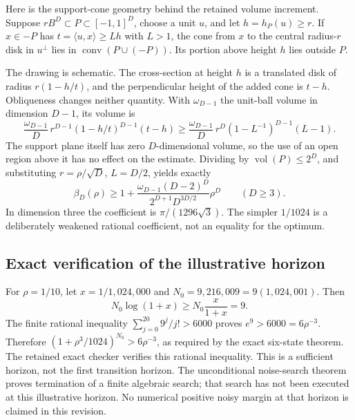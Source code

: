 \documentclass[11pt]{amsart}
\numberwithin{equation}{section}
\DeclareMathOperator{\conv}{conv}
\DeclareMathOperator{\vol}{vol}
\begin{document}
Here is the support-cone geometry behind the retained volume increment. Suppose $rB^D\subset P\subset[-1,1]^D$, choose a unit $u$, and let $h=h_P(u)\ge r$. If $x\in-P$ has $t=\langle u,x\rangle\ge Lh$ with $L>1$, the cone from $x$ to the central radius-$r$ disk in $u^\perp$ lies in $\conv(P\cup(-P))$. Its portion above height $h$ lies outside $P$.
\begin{center}
\end{center}
The drawing is schematic. The cross-section at height $h$ is a translated disk of radius $r(1-h/t)$, and the perpendicular height of the added cone is $t-h$. Obliqueness changes neither quantity. With $\omega_{D-1}$ the unit-ball volume in dimension $D-1$, its volume is
\[
 \frac{\omega_{D-1}}D\,r^{D-1}(1-h/t)^{D-1}(t-h)
 \ge\frac{\omega_{D-1}}D\,r^D(1-L^{-1})^{D-1}(L-1).
\]
The support plane itself has zero $D$-dimensional volume, so the use of an open region above it has no effect on the estimate. Dividing by $\vol(P)\le2^D$, and substituting $r=\rho/\sqrt D$, $L=D/2$, yields exactly
\[
 \beta_D(\rho)\ge1+
 \frac{\omega_{D-1}(D-2)^D}{2^{D+1}D^{3D/2}}\rho^D\qquad(D\ge3).
\]
In dimension three the coefficient is $\pi/(1296\sqrt3)$. The simpler $1/1024$ is a deliberately weakened rational coefficient, not an equality for the optimum.

\subsection{Exact verification of the illustrative horizon}
For $\rho=1/10$, let $x=1/1{,}024{,}000$ and $N_0=9{,}216{,}009=9(1{,}024{,}001)$. Then
\[
 N_0\log(1+x)\ge N_0\frac{x}{1+x}=9.
\]
The finite rational inequality $\sum_{j=0}^{20}9^j/j!>6000$ proves $e^9>6000=6\rho^{-3}$. Therefore $(1+\rho^3/1024)^{N_0}>6\rho^{-3}$, as required by the exact six-state theorem. The retained exact checker verifies this rational inequality. This is a sufficient horizon, not the first transition horizon. The unconditional noise-search theorem proves termination of a finite algebraic search; that search has not been executed at this illustrative horizon. No numerical positive noisy margin at that horizon is claimed in this revision.
\end{document}
